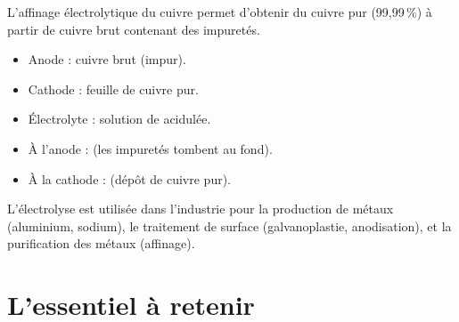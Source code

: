 \begin{propriete}
L'affinage électrolytique du cuivre permet d'obtenir du cuivre pur (99,99\,\%) à partir de cuivre brut contenant des impuretés.
\begin{itemize}
    \item Anode : cuivre brut (impur).
    \item Cathode : feuille de cuivre pur.
    \item Électrolyte : solution de  acidulée.
    \item À l'anode :  (les impuretés tombent au fond).
    \item À la cathode :  (dépôt de cuivre pur).
\end{itemize}
\end{propriete}

\begin{aretenir}
L'électrolyse est utilisée dans l'industrie pour la production de métaux (aluminium, sodium), le traitement de surface (galvanoplastie, anodisation), et la purification des métaux (affinage).
\end{aretenir}

\section{L'essentiel à retenir}

